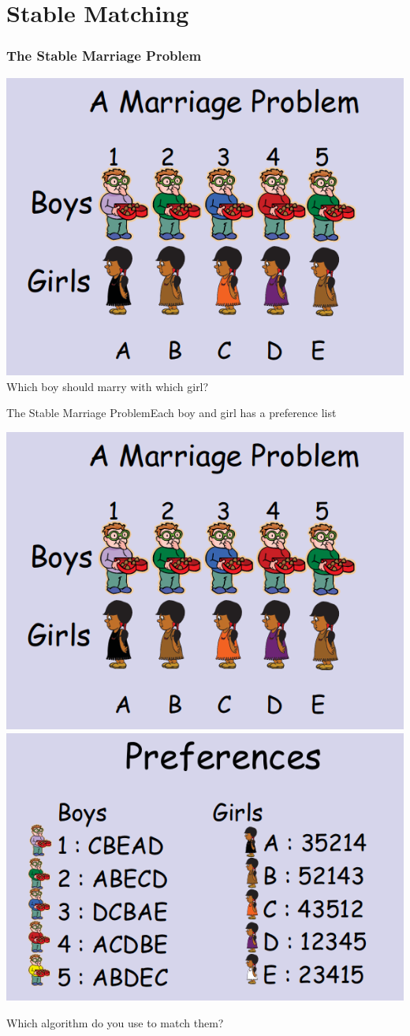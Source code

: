 \section{Stable Matching}


\begin{frame}
  \frametitle{The Stable Marriage Problem}
  \begin{center}
    \includegraphics[width=.5\textwidth]{../img/marriage1}\\
    Which boy should marry with which girl?
  \end{center}

\end{frame}

\begin{frame}{The Stable Marriage Problem}{Each boy and girl has a preference list}

  \begin{center}
    \includegraphics[width=.4\textwidth]{../img/marriage1}
    \includegraphics[width=.45\textwidth]{../img/marriage2}
  \end{center}

  Which algorithm do you use to match them?
\end{frame}

